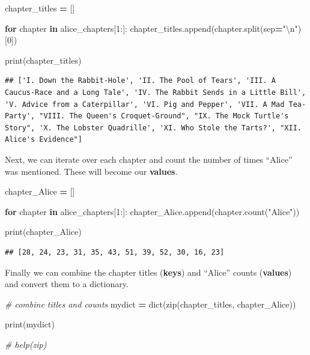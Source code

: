 \documentclass[
]{book}
\newenvironment{Shaded}{\begin{snugshade}}{\end{snugshade}}
\newcommand{\BuiltInTok}[1]{#1}
\newcommand{\CharTok}[1]{\textcolor[rgb]{0.31,0.60,0.02}{#1}}
\newcommand{\CommentTok}[1]{\textcolor[rgb]{0.56,0.35,0.01}{\textit{#1}}}
\newcommand{\ControlFlowTok}[1]{\textcolor[rgb]{0.13,0.29,0.53}{\textbf{#1}}}
\newcommand{\DecValTok}[1]{\textcolor[rgb]{0.00,0.00,0.81}{#1}}
\newcommand{\KeywordTok}[1]{\textcolor[rgb]{0.13,0.29,0.53}{\textbf{#1}}}
\newcommand{\NormalTok}[1]{#1}
\newcommand{\OperatorTok}[1]{\textcolor[rgb]{0.81,0.36,0.00}{\textbf{#1}}}
\newcommand{\StringTok}[1]{\textcolor[rgb]{0.31,0.60,0.02}{#1}}
\begin{document}
\begin{Shaded}
\begin{Highlighting}[]
\NormalTok{chapter\_titles }\OperatorTok{=}\NormalTok{ []}

\ControlFlowTok{for}\NormalTok{ chapter }\KeywordTok{in}\NormalTok{ alice\_chapters[}\DecValTok{1}\NormalTok{:]:}
\NormalTok{    chapter\_titles.append(chapter.split(sep}\OperatorTok{=}\StringTok{"}\CharTok{\textbackslash{}n}\StringTok{"}\NormalTok{)[}\DecValTok{0}\NormalTok{])}

\BuiltInTok{print}\NormalTok{(chapter\_titles)}
\end{Highlighting}
\end{Shaded}

\begin{verbatim}
## ['I. Down the Rabbit-Hole', 'II. The Pool of Tears', 'III. A Caucus-Race and a Long Tale', 'IV. The Rabbit Sends in a Little Bill', 'V. Advice from a Caterpillar', 'VI. Pig and Pepper', 'VII. A Mad Tea-Party', "VIII. The Queen's Croquet-Ground", "IX. The Mock Turtle's Story", 'X. The Lobster Quadrille', 'XI. Who Stole the Tarts?', "XII. Alice's Evidence"]
\end{verbatim}

Next, we can iterate over each chapter and count the number of times ``Alice'' was mentioned. These will become our \textbf{values}.

\begin{Shaded}
\begin{Highlighting}[]
\NormalTok{chapter\_Alice }\OperatorTok{=}\NormalTok{ []}

\ControlFlowTok{for}\NormalTok{ chapter }\KeywordTok{in}\NormalTok{ alice\_chapters[}\DecValTok{1}\NormalTok{:]:}
\NormalTok{    chapter\_Alice.append(chapter.count(}\StringTok{"Alice"}\NormalTok{))}

\BuiltInTok{print}\NormalTok{(chapter\_Alice)  }
\end{Highlighting}
\end{Shaded}

\begin{verbatim}
## [28, 24, 23, 31, 35, 43, 51, 39, 52, 30, 16, 23]
\end{verbatim}

Finally we can combine the chapter titles (\textbf{keys}) and ``Alice'' counts (\textbf{values}) and convert them to a dictionary.

\begin{Shaded}
\begin{Highlighting}[]
\CommentTok{\# combine titles and counts}
\NormalTok{mydict }\OperatorTok{=} \BuiltInTok{dict}\NormalTok{(}\BuiltInTok{zip}\NormalTok{(chapter\_titles, chapter\_Alice))}

\BuiltInTok{print}\NormalTok{(mydict)}

\CommentTok{\# help(zip)         }
\end{Highlighting}
\end{Shaded}
\end{document}
